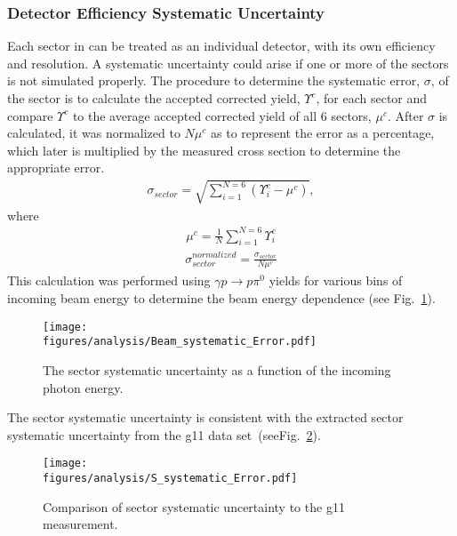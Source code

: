 \subsubsection{Detector Efficiency Systematic Uncertainty}\label{sec:secsystematic}
Each sector in  can be treated as an individual detector, with its own efficiency and resolution. A systematic uncertainty could arise if one or more of the sectors is not simulated properly. The procedure to determine the systematic error, $\sigma$, of the sector is to calculate the accepted corrected yield, $\Upsilon^c$, for each sector and compare $\Upsilon^c$ to the average accepted corrected yield of all 6 sectors, $\mu^c$. After $\sigma$ is calculated, it was normalized to $N \mu^c$ as to represent the error as a percentage, which later is multiplied by the measured cross section to determine the appropriate error. 
\begin{align}
\sigma_{sector} = \sqrt{\sum_{i=1}^{N = 6}\left(\Upsilon_i^c - \mu^c\right)},
\end{align}
where
\begin{align}
\mu^c = \frac{1}{N}\sum_{i=1}^{N=6}\Upsilon_i^c
\end{align}
\begin{align}
\sigma_{sector}^{normalized} = \frac{\sigma_{sector}}{N\mu^c}
\end{align}
This calculation was performed using $\gamma p \rightarrow p \pi^{0}$ yields for various bins of incoming beam energy to determine the beam energy dependence (see Fig.~\ref{fig:sys_sec_error}).

\begin{figure}[h!]\begin{center}
\texttt{[image: \\figures/analysis/Beam\_systematic\_Error.pdf]}
\caption[The sector systematic uncertainty as a function of the incoming photon energy]{\label{fig:sys_sec_error}The sector systematic uncertainty as a function of the incoming photon energy.}
\end{center}\end{figure}
The sector systematic uncertainty is consistent with the extracted sector systematic uncertainty from the g11 data set~\cite{williams}(seeFig.~\ref{fig:sys_sec_error.compare}).
\begin{figure}[h!]\begin{center}
\texttt{[image: \\figures/analysis/S\_systematic\_Error.pdf]}
\caption[Comparison of sector systematic uncertainty to g11 measurement]{\label{fig:sys_sec_error.compare}Comparison of sector systematic uncertainty to the g11 measurement.}
\end{center}\end{figure}
\FloatBarrier

